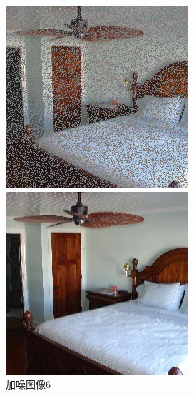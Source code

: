 \begin{figure}[H]
  \centering
  \begin{minipage}[b]{0.3\linewidth}
\includegraphics[width=\linewidth]{Picture/input/00008.png}
    \caption{加噪图像6}
    \label{noised image }
  \end{minipage}
  \hspace{0.1cm} %
   \begin{minipage}[b]{0.3\linewidth}
    \includegraphics[width=\linewidth]{Picture/label/00008.png}

\end{minipage}
\end{figure}
